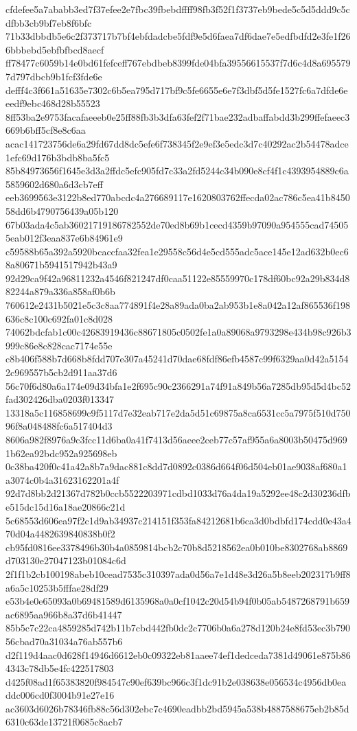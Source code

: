 {cfdefee5a7ababb3ed7f37efee2e7fbc39fbebdffff98fb3f52f1f3737eb9bede5c5d5ddd9c5cdfbb3cb9bf7eb8f6bfc
71b33dbbdb5e6c2f373717b7bf4ebfdadcbe5fdf9e5d6faea7df6dae7e5edfbdfd2e3fe1f266bbbebd5ebfbfbcd8aecf
ff78477c6059b14e0bd61fefceff767ebdbeb8399fde04bfa39556615537f7d6c4d8a6955797d797dbcb9b1fcf3fde6e
defff4c3f661a51635e7302c6b5ea795d717bf9c5fe6655e6e7f3dbf5d5fe1527fc6a7dfde6eeedf9ebc468d28b55523
8ff53ba2e9753facafaeeeb0e25ff88fb3b3dfa63fef2f71bae232adbaffabdd3b299ffefaeec3669b6bff5cf8e8c6aa
acac141723756de6a29fd67dd8dc5efe6f738345f2e9ef3e5edc3d7c40292ac2b54478adce1efc69d176b3bdb8ba5fc5
85b84973656f1645e3d3a2ffdc5efc905fd7c33a2fd5244c34b090e8cf4f1c4393954889c6a5859602d680a6d3cb7eff
eeb3699563e3122b8ed770abcdc4a276689117e1620803762ffecda02ac786c5ea41b845058dd6b4790756439a05b120
67b03ada4c5ab36021719186782552de70ed8b69b1cecd4359b97090a954555cad745055eab012f3eaa837e6b84961e9
c59588b65a392a5920bcaccfaa32fea1e29558c56d4e5cd555adc5ace145e12ad632b0ec68a80671b5941517942b43a9
92d29ca9f42a96811232a4546f821247df0caa51122e85559970c178df60bc92a29b834d882244a879a336a858af0b6b
760612e2431b5021e5c3c8aa774891f4e28a89ada0ba2ab953b1e8a042a12af865536f198636c8c100c692fa01c8d028
74062bdcfab1c00c42683919436c88671805c0502fe1a0a89068a9793298e434b98c926b3999c86e8c828cac7174e55e
c8b406f588b7d668b8fdd707e307a45241d70dae68fdf86efb4587c99f6329aa0d42a51542c969557b5cb2d911aa37d6
56c70f6d80a6a174e09d34bfa1e2f695c90c2366291a74f91a849b56a7285db95d5d4bc52fad302426dba0203f013347
13318a5c116858699c9f5117d7e32eab717e2da5d51c69875a8ca6531cc5a7975f510d75096f8a048488fc6a517404d3
8606a982f8976a9c3fcc11d6ba0a41f7413d56aeee2ceb77c57af955a6a8003b50475d9691b62ea92bdc952a925698eb
0c38ba420f0c41a42a8b7a9dac881c8dd7d0892c0386d664f06d504eb01ae9038af680a1a3074c0b4a31623162201a4f
92d7d8bb2d21367d782b0ccb5522203971cdbd1033d76a4da19a5292ee48c2d30236dfbe515dc15d16a18ae20866c21d
5c68553d606ea97f2c1d9ab34937c214151f353fa84212681b6ca3d0bdbfd174cdd0e43a470d04a4482639840838b0f2
cb95fd0816ee3378496b30b4a0859814bcb2c70b8d5218562ea0b010be8302768ab8869d703130e27047123b01084c6d
2f1f1b2cb100198abeb10cead7535c310397ada0d56a7e1d48e3d26a5b8eeb202317b9ff8a6a5c10253b5fffae28df29
e53b4e0e65093a0b69481589d6135968a0a0cf1042c20d54b94f0b05ab5487268791b659ac6895aa966b8a37d6b41447
85b5c7c22ca4859285d742b11b7cbd442fb0dc2c7706b0a6a278d120b24e8fd53ec3b79056cbad70a31034a76ab557b6
d2f119d4aac0d628f14946d6612eb0c09322eb81aaee74ef1dedceda7381d49061e875b864343c78db5e4fc422517803
d425f08ad1f65383820f984547c90ef639bc966c3f1dc91b2e038638e056534c4956db0eaddc006cd0f3004b91e27e16
ac3603d6026b78346fb88c56d302ebc7c4690eadbb2bd5945a538b4887588675eb2b85d6310c63de13721f0685c8acb7
}
